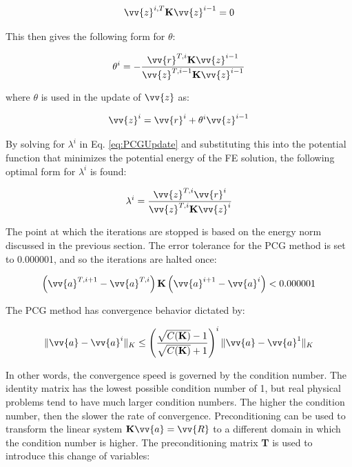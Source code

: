 \documentclass[10pt]{article}
\begin{document}
\begin{equation}
\vv{z}^{i,T}\textbf{K}\vv{z}^{i-1}=0
\end{equation}

This then gives the following form for \(\theta\):

\begin{equation}
\theta^i=-\frac{\vv{r}^{T,i}\textbf{K}\vv{z}^{i-1}}{\vv{z}^{T,i-1}\textbf{K}\vv{z}^{i-1}}
\end{equation}

where \(\theta\) is used in the update of \(\vv{z}\) as:

\begin{equation}
\vv{z}^i=\vv{r}^i+\theta^i\vv{z}^{i-1}
\end{equation}

By solving for \(\lambda^i\) in Eq. \eqref{eq:PCGUpdate} and substituting this into the potential function that minimizes the potential energy of the FE solution, the following optimal form for \(\lambda^i\) is found:

\begin{equation}
\lambda^i=\frac{\vv{z}^{T,i}\vv{r}^i}{\vv{z}^{T,i}\textbf{K}\vv{z}^i}
\end{equation}

The point at which the iterations are stopped is based on the energy norm discussed in the previous section. The error tolerance for the PCG method is set to 0.000001, and so the iterations are halted once:

\begin{equation}
\label{eq:PCGError}
\left(\vv{a}^{T,i+1}-\vv{a}^{T,i}\right)\textbf{K}\left(\vv{a}^{i+1}-\vv{a}^i\right)<0.000001
\end{equation}

The PCG method has convergence behavior dictated by:

\begin{equation}
\label{eq:PCGConvergence}
\|\vv{a}-\vv{a}^{i}\|_K\leq\left(\frac{\sqrt{C(\textbf{K})}-1}{\sqrt{C(\textbf{K})}+1}\right)^i\|\vv{a}-\vv{a}^1\|_K
\end{equation}

In other words, the convergence speed is governed by the condition number. The identity matrix has the lowest possible condition number of 1, but real physical problems tend to have much larger condition numbers. The higher the condition number, then the slower the rate of convergence. Preconditioning can be used to transform the linear system \(\textbf{K}\vv{a}=\vv{R}\) to a different domain in which the condition number is higher. The preconditioning matrix \textbf{T} is used to introduce this change of variables:
\end{document}
